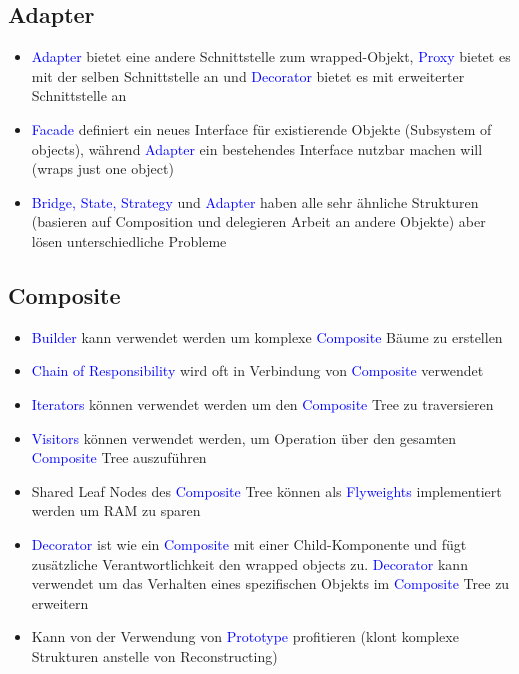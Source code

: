 \subsection{Adapter}

\begin{itemize}
    \item \textcolor{blue}{Adapter} bietet eine andere Schnittstelle zum wrapped-Objekt, \textcolor{blue}{Proxy} bietet es mit der selben Schnittstelle an und \textcolor{blue}{Decorator} bietet es mit erweiterter Schnittstelle an
    \item \textcolor{blue}{Facade} definiert ein neues Interface für existierende Objekte (Subsystem of objects), während \textcolor{blue}{Adapter} ein bestehendes Interface nutzbar machen will (wraps just one object)
    \item \textcolor{blue}{Bridge, State, Strategy} und \textcolor{blue}{Adapter} haben alle sehr ähnliche Strukturen (basieren auf Composition und delegieren Arbeit an andere Objekte) aber lösen unterschiedliche Probleme
\end{itemize}

\subsection{Composite}

\begin{itemize}
    \item \textcolor{blue}{Builder} kann verwendet werden um komplexe \textcolor{blue}{Composite} Bäume zu erstellen
    \item \textcolor{blue}{Chain of Responsibility} wird oft in Verbindung von \textcolor{blue}{Composite} verwendet
    \item \textcolor{blue}{Iterators} können verwendet werden um den \textcolor{blue}{Composite} Tree zu traversieren
    \item \textcolor{blue}{Visitors} können verwendet werden, um Operation über den gesamten \textcolor{blue}{Composite} Tree auszuführen
    \item Shared Leaf Nodes des \textcolor{blue}{Composite} Tree können als \textcolor{blue}{Flyweights} implementiert werden um RAM zu sparen
    \item \textcolor{blue}{Decorator} ist wie ein \textcolor{blue}{Composite} mit einer Child-Komponente und fügt zusätzliche Verantwortlichkeit den wrapped objects zu. \textcolor{blue}{Decorator} kann verwendet um das Verhalten eines spezifischen Objekts im \textcolor{blue}{Composite} Tree zu erweitern
    \item Kann von der Verwendung von \textcolor{blue}{Prototype} profitieren (klont komplexe Strukturen anstelle von Reconstructing)
\end{itemize}

